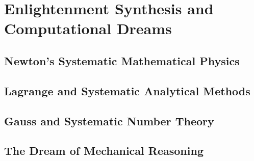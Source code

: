 
\chapter{Enlightenment Synthesis and Computational Dreams}

\section{Newton's Systematic Mathematical Physics}

\section{Lagrange and Systematic Analytical Methods}

\section{Gauss and Systematic Number Theory}

\section{The Dream of Mechanical Reasoning}
